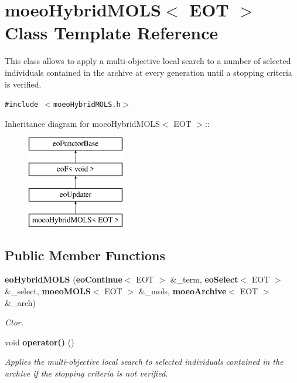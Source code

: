 \section{moeo\-Hybrid\-MOLS$<$ EOT $>$ Class Template Reference}
\label{classmoeoHybridMOLS}
This class allows to apply a multi-objective local search to a number of selected individuals contained in the archive at every generation until a stopping criteria is verified.  


{\tt \#include $<$moeo\-Hybrid\-MOLS.h$>$}

Inheritance diagram for moeo\-Hybrid\-MOLS$<$ EOT $>$::\begin{figure}[H]
\begin{center}
\leavevmode
\includegraphics[height=4cm]{classmoeoHybridMOLS}
\end{center}
\end{figure}
\subsection*{Public Member Functions}
\begin{CompactItemize}
\item 
{\bf eo\-Hybrid\-MOLS} ({\bf eo\-Continue}$<$ EOT $>$ \&\_\-term, {\bf eo\-Select}$<$ EOT $>$ \&\_\-select, {\bf moeo\-MOLS}$<$ EOT $>$ \&\_\-mols, {\bf moeo\-Archive}$<$ EOT $>$ \&\_\-arch)
\begin{CompactList}\small\item\em Ctor. \item\end{CompactList}\item 
void {\bf operator()} ()\label{classmoeoHybridMOLS_f62b4221d0ec094e39b73b386b508fc1}

\begin{CompactList}\small\item\em Applies the multi-objective local search to selected individuals contained in the archive if the stopping criteria is not verified. \item\end{CompactList}\end{CompactItemize}
